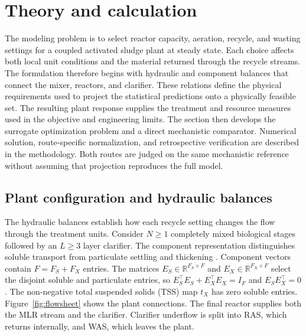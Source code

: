 \documentclass[a4paper,fleqn]{cas-sc}
\newcommand{\R}{\mathbb{R}}
\begin{document}
\section{Theory and calculation}

The modeling problem is to select reactor capacity, aeration, recycle, and wasting settings for a coupled activated sludge plant at steady state. Each choice affects both local unit conditions and the material returned through the recycle streams. The formulation therefore begins with hydraulic and component balances that connect the mixer, reactors, and clarifier. These relations define the physical requirements used to project the statistical predictions onto a physically feasible set. The resulting plant response supplies the treatment and resource measures used in the objective and engineering limits. The section then develops the surrogate optimization problem and a direct mechanistic comparator. Numerical solution, route-specific normalization, and retrospective verification are described in the methodology. Both routes are judged on the same mechanistic reference without assuming that projection reproduces the full model.

\subsection{Plant configuration and hydraulic balances}

The hydraulic balances establish how each recycle setting changes the flow through the treatment units. Consider $N\ge1$ completely mixed biological stages followed by an $L\ge3$ layer clarifier. The component representation distinguishes soluble transport from particulate settling and thickening \citep{Takacs1991,JeppssonDiehl1996}. Component vectors contain $F=F_S+F_X$ entries. The matrices $E_S\in\R^{F_S\times F}$ and $E_X\in\R^{F_X\times F}$ select the disjoint soluble and particulate entries, so $E_S^\top E_S+E_X^\top E_X=I_F$ and $E_SE_X^\top=0$. The non-negative total suspended solids (TSS) map $t_X$ has zero soluble entries. Figure~\ref{fig:flowsheet} shows the plant connections. The final reactor supplies both the MLR stream and the clarifier. Clarifier underflow is split into RAS, which returns internally, and WAS, which leaves the plant.
\end{document}

